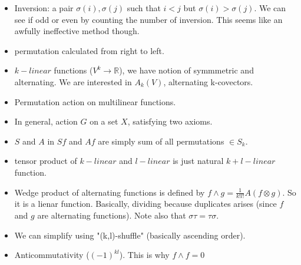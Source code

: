 \documentclass{article}
\theoremstyle{remark}
\begin{document}
\begin{itemize}
\item Inversion: a pair $\sigma(i),\sigma(j)$ such that $i<j$ but $\sigma(i)>\sigma(j)$. We can see if odd or even by counting the number of inversion. This seems like an awfully ineffective method though. 
\item permutation calculated from right to left.
\item $k-linear$ functions ($V^k\to\mathbb{R}$), we have notion of symmmetric and alternating. We are interested in $A_k (V)$, alternating k-covectors.
\item Permutation action on multilinear functions.
\item In general, action $G$ on a set $X$, satisfying two axioms.
\item $S$ and $A$ in $Sf$ and $Af$ are simply sum of all permutations $\in S_k$.
\item tensor product of $k-linear$ and $l-linear$ is just natural $k+l-linear$ function.
\item Wedge product of alternating functions is defined by $f\wedge g=\frac 1{k!l!}A(f\otimes g)$. So it is a lienar function. Basically, dividing because duplicates arises (since $f$ and $g$ are alternating functions). Note also that $\sigma\tau=\tau\sigma$.
\item We can simplify using "(k,l)-shuffle" (basically ascending order).
\item Anticommutativity ($(-1)^{kl}$). This is why $f\wedge f=0$

\end{itemize}
\end{document}
